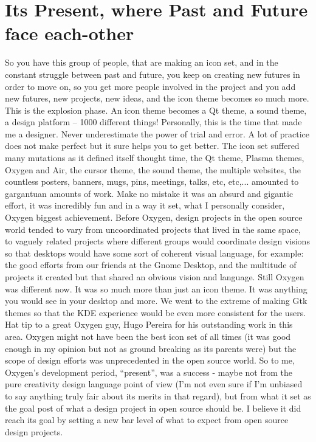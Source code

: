 \section*{Its Present, where Past and Future face each-other}
So you have this group of people, that are making an icon set, and in the constant struggle between past and future, you keep on creating new futures in order to move on, so you get more people involved in the project and you add new futures, new projects, new ideas, and the icon theme becomes so much more. This is the explosion phase. An icon theme becomes a Qt theme, a sound theme, a design platform – 1000 different things!
Personally, this is the time that made me a designer. Never underestimate the power of trial and error. A lot of practice does not make perfect but it sure helps you to get better.
The icon set suffered many mutations as it defined itself thought time, the Qt theme, Plasma themes, Oxygen and Air, the cursor theme, the sound theme, the multiple websites, the countless posters, banners, mugs, pins, meetings, talks, etc, etc,... amounted to gargantuan amounts of work. 
Make no mistake it was an absurd and gigantic effort, it was incredibly fun and in a way it set, what I personally consider, Oxygen biggest achievement.
Before Oxygen, design projects in the open source world tended to vary from uncoordinated projects that lived in the same space, to vaguely related projects where different groups would coordinate design visions so that desktops would have some sort of coherent visual language, for example: the good efforts from our friends at the Gnome Desktop, and the multitude of projects it created but that shared an obvious vision and language.
Still Oxygen was different now. It was so much more than just an icon theme. It was anything you would see in your desktop and more. We went to the extreme of making Gtk themes so that the KDE experience would be even more consistent for the users. Hat tip to a great Oxygen guy, Hugo Pereira for his outstanding work in this area.
Oxygen might not have been the best icon set of all times (it was good enough in my opinion but not as ground breaking as its parents were) but the scope of design efforts was unprecedented in the open source world. 
So to me, Oxygen's development period, “present”,  was a success - maybe not from the pure creativity design language point of view (I'm not even sure if I'm unbiased to say anything truly fair about its merits in that regard), but from what it set as the goal post of what a design project in open source should be. I believe it did reach its goal by setting a new bar level of what to expect from open source design projects.

